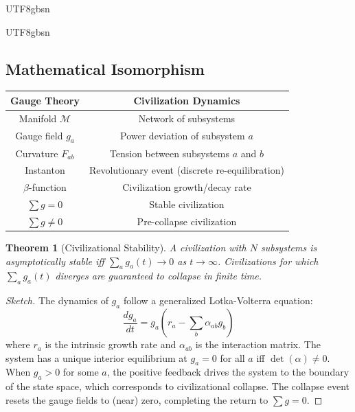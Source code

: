 \documentclass[11pt,a4paper]{article}
\newtheorem{theorem}{Theorem}[section]
\newcommand{\Manifold}{\mathcal{M}}
\begin{document}
\begin{CJK}{UTF8}{gbsn}
{\begin{CJK}{UTF8}{gbsn}
\subsection{Mathematical Isomorphism}
\begin{center}
\begin{tabular}{c|c}
    \textbf{Gauge Theory} & \textbf{Civilization Dynamics} \\
    \hline
    Manifold $\Manifold$ & Network of subsystems \\
    Gauge field $g_a$ & Power deviation of subsystem $a$ \\
    Curvature $F_{ab}$ & Tension between subsystems $a$ and $b$ \\
    Instanton & Revolutionary event (discrete re-equilibration) \\
    $\beta$-function & Civilization growth/decay rate \\
    $\sum g = 0$ & Stable civilization \\
    $\sum g \neq 0$ & Pre-collapse civilization \\
\end{tabular}
\end{center}
\begin{theorem}[Civilizational Stability]
A civilization with $N$ subsystems is asymptotically stable iff $\sum_a g_a(t) \to 0$
as $t \to \infty$. Civilizations for which $\sum_a g_a(t)$ diverges are guaranteed
to collapse in finite time.
\end{theorem}
\begin{proof}[Sketch]
The dynamics of $g_a$ follow a generalized Lotka-Volterra equation:
\begin{equation}
    \frac{d g_a}{dt} = g_a \left(r_a - \sum_b \alpha_{ab} g_b\right)
\end{equation}
where $r_a$ is the intrinsic growth rate and $\alpha_{ab}$ is the interaction matrix.
The system has a unique interior equilibrium at $g_a = 0$ for all $a$ iff
$\det(\alpha) \neq 0$. When $g_a > 0$ for some $a$, the positive feedback drives
the system to the boundary of the state space, which corresponds to civilizational
collapse. The collapse event resets the gauge fields to (near) zero, completing the
return to $\sum g = 0$.
\end{proof}

\end{CJK}}
\end{CJK}
\end{document}
